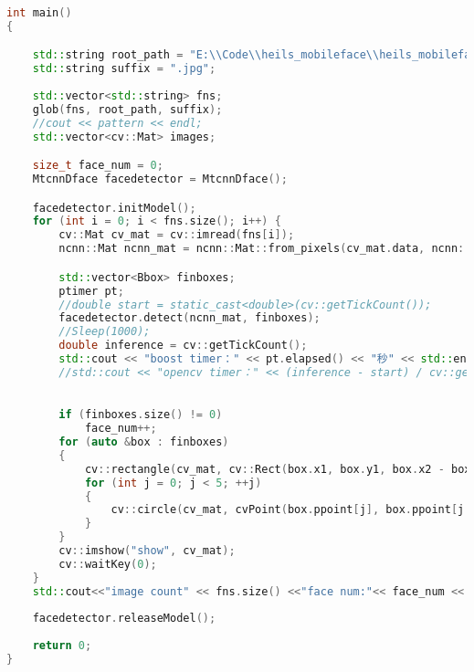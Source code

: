 {\fontsize{10pt}{0.5\baselineskip}\selectfont
	\begin{lstlisting}[language=C++,caption={空时~LMS~算法~Verilog~模块端口声明},label={code_appB_lms}]
int main()
{

	std::string root_path = "E:\\Code\\heils_mobileface\\heils_mobileface\\heils_mobileface\\images\\lack";
	std::string suffix = ".jpg";
	
	std::vector<std::string> fns;
	glob(fns, root_path, suffix);
	//cout << pattern << endl;
	std::vector<cv::Mat> images;

	size_t face_num = 0;
	MtcnnDface facedetector = MtcnnDface();

	facedetector.initModel();
	for (int i = 0; i < fns.size(); i++) {
		cv::Mat cv_mat = cv::imread(fns[i]);
		ncnn::Mat ncnn_mat = ncnn::Mat::from_pixels(cv_mat.data, ncnn::Mat::PIXEL_BGR2RGB, cv_mat.cols, cv_mat.rows);

		std::vector<Bbox> finboxes;
		ptimer pt;
		//double start = static_cast<double>(cv::getTickCount());
		facedetector.detect(ncnn_mat, finboxes);
		//Sleep(1000);
		double inference = cv::getTickCount();
		std::cout << "boost timer：" << pt.elapsed() << "秒" << std::endl;
		//std::cout << "opencv timer：" << (inference - start) / cv::getTickFrequency() << "秒" << std::endl;
		

		if (finboxes.size() != 0)
			face_num++;
		for (auto &box : finboxes)
		{
			cv::rectangle(cv_mat, cv::Rect(box.x1, box.y1, box.x2 - box.x1 + 1, box.y2 - box.y1 + 1), cv::Scalar(0, 255, 255), 2);
			for (int j = 0; j < 5; ++j)
			{
				cv::circle(cv_mat, cvPoint(box.ppoint[j], box.ppoint[j + 5]), 2, CV_RGB(0, 255, 0), CV_FILLED);
			}
		}
		cv::imshow("show", cv_mat);
		cv::waitKey(0);
	}
	std::cout<<"image count" << fns.size() <<"face num:"<< face_num << std::endl;
	
  	facedetector.releaseModel();
	
	return 0;
}

	\end{lstlisting}
}

\clearpage{\pagestyle{empty}\cleardoublepage}
